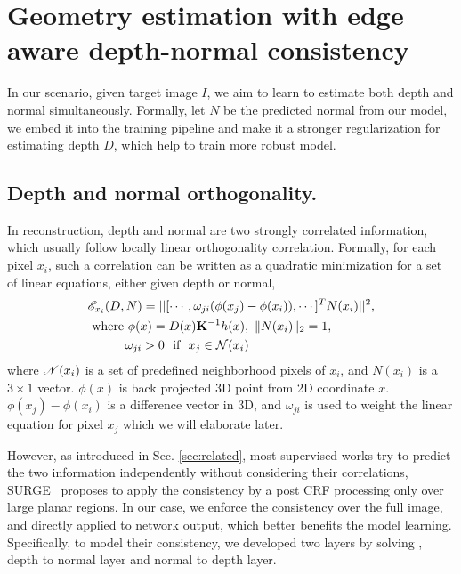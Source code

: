 \section{Geometry estimation with edge aware depth-normal consistency}
\label{sec:approach}
In our scenario, given target image $I$, we aim to learn to estimate both depth and normal simultaneously. Formally, let $N$ be the predicted normal from our model, we embed it into the training pipeline and make it a stronger regularization for estimating depth $D$, which help to train more robust model.

\subsection{Depth and normal orthogonality.}
\label{sub:depth_and_normal_orthogonality_}
In reconstruction, depth and normal are two strongly correlated information, which usually follow locally linear orthogonality correlation. Formally, for each pixel $x_i$, such a correlation can be written as a quadratic minimization for a set of linear equations, either given depth or normal,
\begin{align}
\label{eq:orthognal}
&{\mathscr E}_{x_i}(D, N) = ||[\cdots,\omega_{ji}(\phi(x_j) - \phi(x_i)), \cdots]^T  N(x_i)||^2, \nonumber \\
&~\text{where~} \phi(x) = D(x){\mathbf K}^{-1}h(x), \text{~} \|N(x_i)\|_2 = 1, \nonumber\\
&~\text{~~~~~~~~} \omega_{ji} > 0 \text{~~if~~} x_j \in {\mathcal N}(x_i)
\end{align}
where ${\mathscr N}(x_i)$ is a set of predefined neighborhood pixels of $x_i$, and $N(x_i)$ is a $3 \times 1$ vector. $\phi(x)$ is back projected 3D point from 2D coordinate $x$. $\phi(x_j) - \phi(x_i)$ is a difference vector in 3D, and $\omega_{ji}$ is used to weight the linear equation for pixel $x_j$ which we will elaborate later.

However, as introduced in Sec. \ref{sec:related}, most supervised works try to predict the two information independently without considering their correlations, SURGE~\cite{peng2016depth} proposes to apply the consistency by a post CRF processing only over large planar regions. In our case, we enforce the consistency over the full image, and directly applied to network output, which better benefits the model learning. Specifically, to model their consistency, we developed two layers by solving , \ie depth to normal layer and normal to depth layer. 

